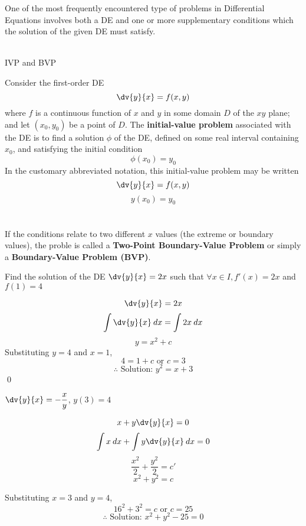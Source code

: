 One of the most frequently encountered type of problems in Differential Equations involves both a DE and one or more supplementary conditions which the solution of the given DE must satisfy. \\~\\

\begin{definition}{IVP and BVP}
    
    Consider the first-order DE \[
        \dv{y}{x} = f(x,y)
    \] where $f$ is a continuous function of $x$ and $y$ in some domain $D$ of the $xy$ plane; and let $(x_0,y_0)$ be a point of $D$. The \textbf{initial-value problem} associated with the DE is to find a solution $\phi$ of the DE, defined on some real interval containing $x_0$, and satisfying the initial condition \[
        \phi(x_0) = y_0
    \] In the customary abbreviated notation, this initial-value problem may be written \[
        \dv{y}{x} = f(x,y)
    \] \[
        y(x_0) = y_0
    \] \\~\\

    If the conditions relate to two different $x$ values (the extreme or boundary values), the proble is called a \textbf{Two-Point Boundary-Value Problem} or simply a \textbf{Boundary-Value Problem (BVP)}.
\end{definition}

\begin{example}{Find the solution of the DE $\dv{y}{x} = 2x$ such that $\forall x\in I, f'(x) = 2x$ and  $f(1)=4$}
    
    \[ \dv{y}{x} = 2x \]
    \[ \int {\dv{y}{x}} \: d{x} = \int {2x} \: d{x} \]
    \[ y = x^2 + c \]
    Substituting $y=4$ and $x=1$,
    \[ 4 = 1 + c \text{ or } c = 3 \]
    \[ \therefore \text{ Solution: } y^2 = x + 3 \] \qed
\end{example}

\begin{example}{$\dv{y}{x} = -\dfrac{x}{y}$, $y(3)=4$}
    
    \[ x + y \dv{y}{x} = 0 \]
    \[ \int{x} \: d{x} + \int{y \dv{y}{x}} \: d{x} = 0 \]
    \[ \frac{x^2}{2} + \frac{y^2}{2} = c' \]
    \[ x^2 + y^2 = c \]

    Substituting $x=3$ and $y=4$,
    \[ 16^2 + 3^2 = c \text{ or } c = 25 \]
    \[ \therefore \text{ Solution: } x^2 + y^2 - 25 = 0 \]
\end{example}


